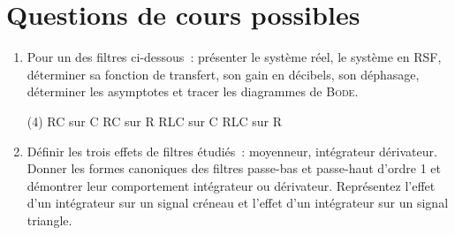 \documentclass[a4paper, 12pt, final, garamond]{book}
\begin{document}
\newpage

\section{Questions de cours possibles}
\begin{enumerate}
	\item Pour un des filtres ci-dessous~: présenter le système réel, le système
	      en RSF, déterminer sa fonction de transfert, son gain en décibels, son
	      déphasage, déterminer les asymptotes et tracer les diagrammes de
	      \textsc{Bode}.
	      \begin{tasks}(4)
		      \task RC sur C
		      \task RC sur R
		      \task RLC sur C
		      \task RLC sur R
	      \end{tasks}
	\item Définir les trois effets de filtres étudiés~: moyenneur, intégrateur
	      dérivateur. Donner les formes canoniques des filtres passe-bas et passe-haut
	      d'ordre 1 et démontrer leur comportement intégrateur ou dérivateur.
	      Représentez l'effet d'un intégrateur sur un signal créneau et l'effet d'un
	      intégrateur sur un signal triangle.
\end{enumerate}
\end{document}
